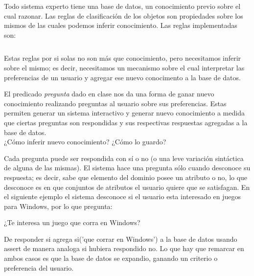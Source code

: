 \documentclass[11pt,oneside,a4paper]{article}
\begin{document}

Todo sistema experto tiene una base de datos, un conocimiento previo sobre el
cual razonar. Las reglas de clasificación de los objetos son propiedades
sobre los mismos de las cuales podemos inferir conocimiento. Las reglas 
implementadas son:

\inputminted[firstline=1, lastline=15, fontsize=\footnotesize]{perl}{tp-prolog.pl}

Estas reglas por si solas no son más que conocimiento, pero necesitamos inferir 
sobre el mismo; es decir, necesitamos un mecanismo sobre el cual interpretar las preferencias 
de un usuario y agregar ese nuevo conocimento a la base de datos.


El predicado \emph{pregunta} dado en clase nos da una forma de ganar nuevo conocimiento
realizando preguntas al usuario sobre sus preferencias.
Estas permiten generar un sistema interactivo y generar nuevo %
conocimiento a medida que ciertas preguntas son respondidas y sus respectivas respuestas
agregadas a la base de datos.\\



¿Cómo inferir nuevo conocimiento? ¿Cómo lo guardo?

Cada pregunta puede ser respondida con sí o no (o una leve variación 
sintáctica de alguna de las mismas). El sistema hace una pregunta 
sólo cuando desconoce su respuesta; es decir, sabe que elemento del dominio 
posee un atributo o no, lo que desconoce es en que conjuntos de atributos 
el usuario quiere que se satisfagan. En el siguiente ejemplo el 
sistema desconoce si el usuario esta interesado en juegos para Windows, por lo
que pregunta:

¿Te interesa un juego que corra en Windows? 

De responder si agrega si('que corrar en Windows') a la base de datos usando 
assert de manera analoga si hubiera respondido no. Lo que hay que remarcar en ambos casos 
es que la base de datos se expandio, ganando un criterio o preferencia del usuario.
\end{document}
